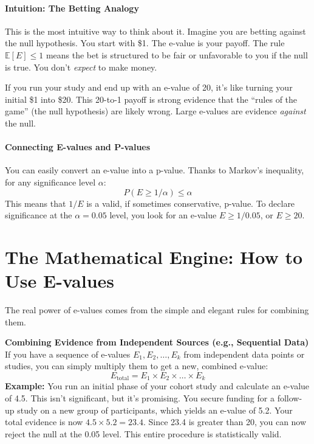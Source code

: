 \documentclass[11pt]{article}
\begin{document}
\paragraph{Intuition: The Betting Analogy}
This is the most intuitive way to think about it. Imagine you are betting against the null hypothesis. You start with \$1. The e-value is your payoff. The rule $\mathbb{E}[E] \le 1$ means the bet is structured to be fair or unfavorable to you if the null is true. You don't \textit{expect} to make money.

If you run your study and end up with an e-value of 20, it's like turning your initial \$1 into \$20. This 20-to-1 payoff is strong evidence that the ``rules of the game'' (the null hypothesis) are likely wrong. Large e-values are evidence \textit{against} the null.

\paragraph{Connecting E-values and P-values}
You can easily convert an e-value into a p-value. Thanks to Markov's inequality, for any significance level $\alpha$:
$$ P(E \ge 1/\alpha) \le \alpha $$
This means that $1/E$ is a valid, if sometimes conservative, p-value. To declare significance at the $\alpha = 0.05$ level, you look for an e-value $E \ge 1/0.05$, or $E \ge 20$.

\section*{The Mathematical Engine: How to Use E-values}
The real power of e-values comes from the simple and elegant rules for combining them.

\begin{notebox}
\textbf{Combining Evidence from Independent Sources (e.g., Sequential Data)}\\
If you have a sequence of e-values $E_1, E_2, \dots, E_k$ from independent data points or studies, you can simply multiply them to get a new, combined e-value:
$$ E_{\text{total}} = E_1 \times E_2 \times \dots \times E_k $$
\textbf{Example:} You run an initial phase of your cohort study and calculate an e-value of 4.5. This isn't significant, but it's promising. You secure funding for a follow-up study on a new group of participants, which yields an e-value of 5.2. Your total evidence is now $4.5 \times 5.2 = 23.4$. Since 23.4 is greater than 20, you can now reject the null at the 0.05 level. This entire procedure is statistically valid.
\end{notebox}
\end{document}
